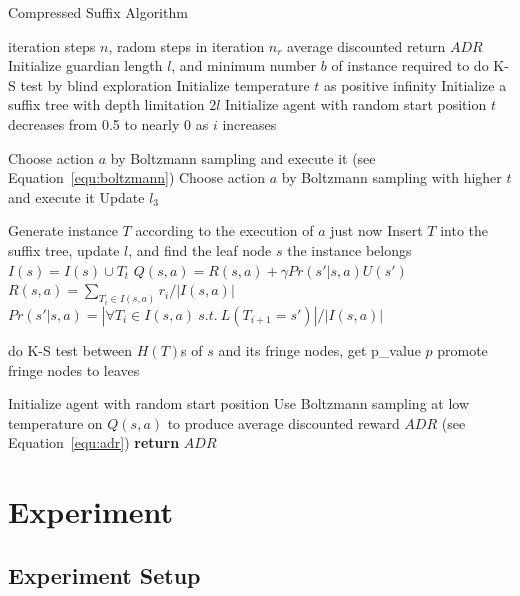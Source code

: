 \documentclass[conference]{IEEEtran}
\begin{document}
	\begin{algorithm}[h]
		\renewcommand{\algorithmicrequire}{\textbf{Input:}}
		\renewcommand{\algorithmicensure}{\textbf{Output:}}
		\caption{Compressed Suffix Algorithm}
		\label{alg:CSM}
		\begin{algorithmic}[1]
			\REQUIRE iteration steps $n$, radom steps in iteration $n_r$
			\ENSURE average discounted return $ADR$
			\STATE Initialize guardian length $l$, and minimum number $b$ of instance required to do K-S test
			by blind exploration
			\STATE Initialize temperature $t$ as positive infinity
			\STATE Initialize a suffix tree with depth limitation $2l$
			\STATE Initialize agent with random start position
			\STATE $t$ decreases from 0.5 to nearly 0 as $i$ increases
			\ENDIF
			
			\STATE Choose action $a$ by Boltzmann sampling and execute it (see Equation~\ref{equ:boltzmann})
			\STATE Choose action $a$ by Boltzmann sampling with higher $t$ and execute it
			\STATE Update $l_3$
			\ENDIF
			\ENDWHILE
			
			\STATE Generate instance $T$ according to the execution of $a$ just now
			\STATE Insert $T$ into the suffix tree, update $l$, and find the leaf node $s$ the instance belongs
			\STATE $I(s) = I(s) \cup {T_t}$
			\STATE $Q(s,a) = R(s,a) + \gamma Pr(s'|s,a)U(s')$
			\STATE $R(s,a) = {\sum_{T_i \in I(s,a)}r_i}/{|I(s,a)|}$
			\STATE $Pr(s'|s,a) = {|\forall{T_i \in I(s,a) \ s.t. \ L(T_{i+1} = s')}|} / {|I(s,a)|}$
			
			\STATE do K-S test between $H(T)$s of $s$ and its fringe nodes, get p\_value $p$ 
			\STATE promote fringe nodes to leaves
			\ENDIF
			\ENDIF
			
			\STATE Initialize agent with random start position
			\ENDIF
			\ENDFOR
			\STATE Use Boltzmann sampling at low temperature on $Q(s, a)$ to produce average
			discounted reward $ADR$ (see Equation~\ref{equ:adr})
			\STATE \textbf{return} $ADR$
		\end{algorithmic}  
	\end{algorithm}
	
	\section{Experiment}
	
	\subsection{Experiment Setup}
	
\end{document}
